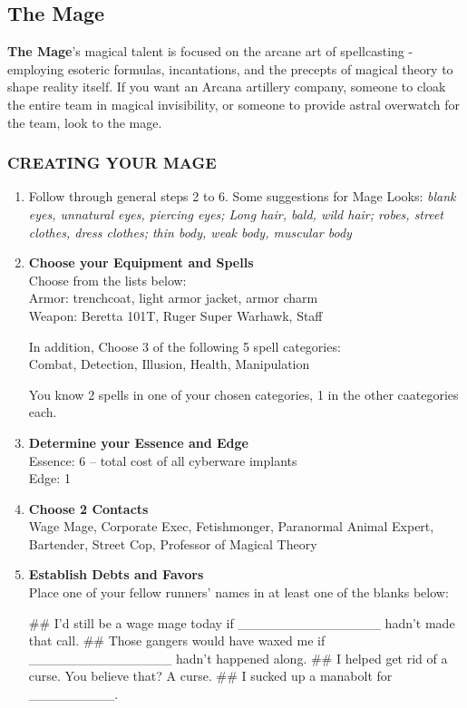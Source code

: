 \clearpage
\subsection{The Mage}
\textbf{The Mage}’s magical talent is focused on the arcane art of spellcasting - employing esoteric formulas, incantations, and the precepts of magical theory to shape reality itself. If you want an Arcana artillery company, someone to cloak the entire team in magical invisibility, or someone to provide astral overwatch for the team, look to the mage.

\subsubsection{CREATING YOUR MAGE}
\begin{enumerate}
    \item Follow through general steps 2 to 6. Some suggestions for Mage Looks: \textit{blank eyes, unnatural eyes, piercing eyes; Long hair, bald, wild hair; robes, street clothes, dress clothes; thin body, weak body, muscular body}
    
    \item \textbf{Choose your Equipment and Spells} \\
    Choose from the lists below: \\
    Armor: trenchcoat, light armor jacket, armor charm \\
    Weapon: Beretta 101T, Ruger Super Warhawk, Staff
    
    In addition, Choose 3 of the following 5 spell categories: \\
    Combat, Detection, Illusion, Health, Manipulation
    
    You know 2 spells in one of your chosen categories, 1 in the other caategories each.
    
    \item \textbf{Determine your Essence and Edge} \\
    Essence: 6 – total cost of all cyberware implants \\
    Edge: 1
    
    \item \textbf{Choose 2 Contacts} \\
    Wage Mage, Corporate Exec, Fetishmonger, Paranormal Animal Expert, Bartender, Street Cop, Professor of Magical Theory
    
    \item \textbf{Establish Debts and Favors} \\
    Place one of your fellow runners’ names in at least one of the blanks below:
        \begin{easylist}
            ## I’d still be a wage mage today if \_\_\_\_\_\_\_\_\_\_\_\_\_\_\_ hadn’t made that call.
            ## Those gangers would have waxed me if \_\_\_\_\_\_\_\_\_\_\_\_\_\_\_ hadn’t happened along.
            ## I helped get rid of a curse. You believe that? A curse.
            ## I sucked up a manabolt for \_\_\_\_\_\_\_\_\_.
        \end{easylist}
    

\end{enumerate}

